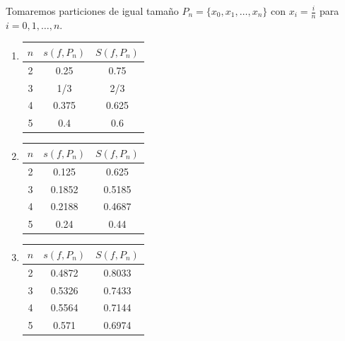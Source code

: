 \documentclass[
  a4paper,
]{scrreport}
\theoremstyle{definition}
\theoremstyle{remark}
\begin{document}
\begin{tcolorbox}[enhanced jigsaw, colbacktitle=quarto-callout-tip-color!10!white, coltitle=black, arc=.35mm, opacityback=0, breakable, colback=white, bottomtitle=1mm, opacitybacktitle=0.6, rightrule=.15mm, colframe=quarto-callout-tip-color-frame, title=\textcolor{quarto-callout-tip-color}{\faLightbulb}\hspace{0.5em}{Tip}, toptitle=1mm, titlerule=0mm, bottomrule=.15mm, left=2mm, leftrule=.75mm, toprule=.15mm]

Tomaremos particiones de igual tamaño \(P_n=\{x_0,x_1,\ldots,x_n\}\) con
\(x_i=\frac{i}{n}\) para \(i=0,1,\ldots, n\).

\begin{enumerate}
\def\labelenumi{\alph{enumi}.}
\item
  \begin{longtable}[]{@{}ccc@{}}
  \toprule()
  \(n\) & \(s(f,P_n)\) & \(S(f,P_n)\) \\
  \midrule()
  \endhead
  2 & 0.25 & 0.75 \\
  3 & 1/3 & 2/3 \\
  4 & 0.375 & 0.625 \\
  5 & 0.4 & 0.6 \\
  \bottomrule()
  \end{longtable}
\item
  \begin{longtable}[]{@{}ccc@{}}
  \toprule()
  \(n\) & \(s(f,P_n)\) & \(S(f,P_n)\) \\
  \midrule()
  \endhead
  2 & 0.125 & 0.625 \\
  3 & 0.1852 & 0.5185 \\
  4 & 0.2188 & 0.4687 \\
  5 & 0.24 & 0.44 \\
  \bottomrule()
  \end{longtable}
\item
  \begin{longtable}[]{@{}ccc@{}}
  \toprule()
  \(n\) & \(s(f,P_n)\) & \(S(f,P_n)\) \\
  \midrule()
  \endhead
  2 & 0.4872 & 0.8033 \\
  3 & 0.5326 & 0.7433 \\
  4 & 0.5564 & 0.7144 \\
  5 & 0.571 & 0.6974 \\
  \bottomrule()
  \end{longtable}
\end{enumerate}

\end{tcolorbox}
\end{document}
